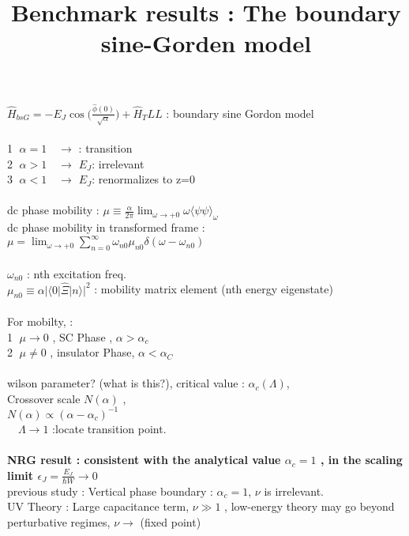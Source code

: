 \documentclass{article}
\title{Benchmark results : The boundary sine-Gorden model}
\begin{document}
\maketitle

$\hat{H}_{bsG} = -E_J \cos \big(\frac{\hat{\phi}(0)}{\sqrt{\alpha}}\big) + \hat{H}_TLL$ : boundary sine Gordon model \\
 \\
\textcircled{1} $\alpha=1 \quad \rightarrow$ : transition\\
\textcircled{2} $\alpha > 1 \quad \rightarrow$ $E_J$: irrelevant\\
\textcircled{3} $\alpha < 1 \quad \rightarrow$ $E_J$: renormalizes to z=0
\\
 \\
 

dc phase mobility : $\mu \equiv \frac{\alpha}{2\pi} \lim_{\omega \to +0}\omega \langle \psi \psi \rangle _\omega$
\\ dc phase mobility in transformed frame : $\mu =  \lim_{\omega \to +0} \sum^\infty_{n=0} \omega_{n0}\mu_{n0}\delta(\omega - \omega_{n0})$
\\
 \\
$\omega_{n0}$ : nth excitation freq.\\
$\mu_{n0} \equiv \alpha | \langle 0|\hat{\Xi} | n \rangle |^2$ : mobility matrix element (nth energy eigenstate)\\
\\
For mobilty, :\\
\textcircled{1} $\mu \rightarrow 0$ , SC Phase , $\alpha > \alpha_c$\\
\textcircled{2} $\mu \neq 0$ , insulator Phase, $\alpha < \alpha_C$
\\
\\
wilson parameter? (what is this?), critical value : $\alpha_c(\Lambda)$,\\
Crossover scale $N(\alpha)$ ,\\
$N(\alpha) \propto (\alpha - \alpha_c)^{-1}\quad$ \\
$\quad \Lambda \rightarrow 1$ :locate transition point. \\
\\
\textbf{NRG result : consistent with the analytical value $\alpha_c =1$ , in the scaling limit $\epsilon_J = \frac{E_J}{\hbar W} \rightarrow 0$}
\\


previous study : Vertical phase boundary : $\alpha_c = 1$, $\nu$ is irrelevant.\\
UV Theory : Large capacitance term, $\nu \gg 1$ , low-energy theory may go beyond perturbative regimes, $\nu \rightarrow$ (fixed point)
\end{document}
